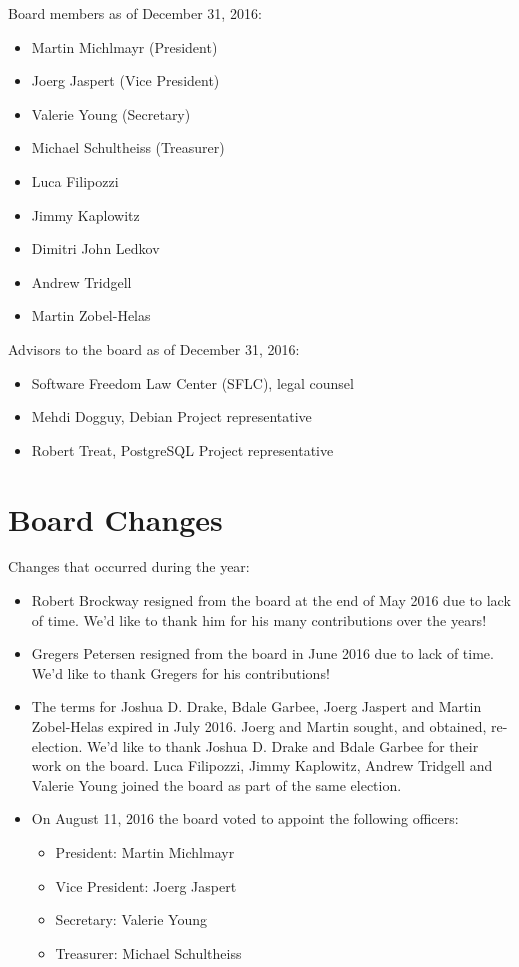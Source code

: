 \documentclass[letterpaper]{report}
\begin{document}
Board members as of December 31, 2016:

\begin{itemize}
\item Martin Michlmayr (President)
\item Joerg Jaspert (Vice President)
\item Valerie Young (Secretary)
\item Michael Schultheiss (Treasurer)
\item Luca Filipozzi
\item Jimmy Kaplowitz
\item Dimitri John Ledkov
\item Andrew Tridgell
\item Martin Zobel-Helas
\end{itemize}

Advisors to the board as of December 31, 2016:

\begin{itemize}
\item Software Freedom Law Center (SFLC), legal counsel
\item Mehdi Dogguy, Debian Project representative
\item Robert Treat, PostgreSQL Project representative
\end{itemize}

\section{Board Changes}

Changes that occurred during the year:

\begin{itemize}

\item Robert Brockway resigned from the board at the end of May 2016 due
to lack of time.  We'd like to thank him for his many contributions over
the years!

\item Gregers Petersen resigned from the board in June 2016 due to lack
of time.  We'd like to thank Gregers for his contributions!

\item The terms for Joshua D. Drake, Bdale Garbee, Joerg Jaspert and
Martin Zobel-Helas expired in July 2016.  Joerg and Martin sought, and
obtained, re-election.  We'd like to thank Joshua D. Drake and Bdale
Garbee for their work on the board.  Luca Filipozzi, Jimmy Kaplowitz,
Andrew Tridgell and Valerie Young joined the board as part of the same
election.

\item On August 11, 2016 the board voted to appoint the following
officers:

\begin{itemize}
\item President: Martin Michlmayr
\item Vice President: Joerg Jaspert
\item Secretary: Valerie Young
\item Treasurer: Michael Schultheiss
\end{itemize}

\end{itemize}
\end{document}
